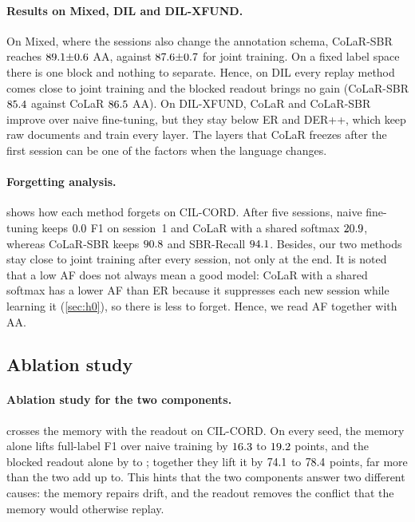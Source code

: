 \documentclass[10pt,twocolumn,letterpaper]{article}
\begin{document}
\paragraph{Results on Mixed, DIL and DIL-XFUND.} On Mixed, where the sessions also change the annotation schema, CoLaR-SBR reaches $89.1{\pm}0.6$ AA, against $87.6{\pm}0.7$ for joint training. On a fixed label space there is one block and nothing to separate. Hence, on DIL every replay method comes close to joint training and the blocked readout brings no gain (CoLaR-SBR $85.4$ against CoLaR $86.5$ AA). On DIL-XFUND, CoLaR and CoLaR-SBR improve over naive fine-tuning, but they stay below ER and DER++, which keep raw documents and train every layer. The layers that CoLaR freezes after the first session can be one of the factors when the language changes.

\paragraph{Forgetting analysis.}  shows how each method forgets on CIL-CORD. After five sessions, naive fine-tuning keeps $0.0$ F1 on session~1 and CoLaR with a shared softmax $20.9$, whereas CoLaR-SBR keeps $90.8$ and SBR-Recall $94.1$. Besides, our two methods stay close to joint training after every session, not only at the end. It is noted that a low AF does not always mean a good model: CoLaR with a shared softmax has a lower AF than ER because it suppresses each new session while learning it (\cref{sec:h0}), so there is less to forget. Hence, we read AF together with AA.

\subsection{Ablation study}
\label{sec:ablations}
\begin{table}[t]
\centering\small
\setlength{\tabcolsep}{3pt}
\caption{\textbf{The two components} on CIL-CORD (mean $\pm$ s.d. over three seeds).}
\label{tab:2x2}
\resizebox{\linewidth}{!}{}
\end{table}

\paragraph{Ablation study for the two components.}  crosses the memory with the readout on CIL-CORD. On every seed, the memory alone lifts full-label F1 over naive training by $16.3$ to $19.2$ points, and the blocked readout alone by \nAblReadMin{} to \nAblReadMax; together they lift it by $74.1$ to $78.4$ points, far more than the two add up to. This hints that the two components answer two different causes: the memory repairs drift, and the readout removes the conflict that the memory would otherwise replay.
\end{document}
